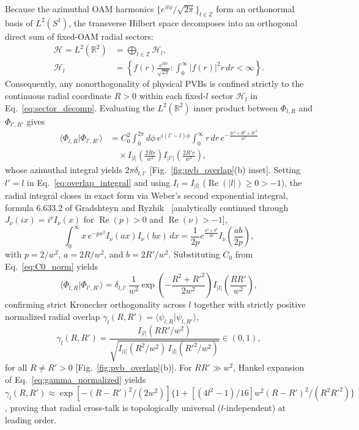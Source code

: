 \documentclass[aps,pra,onecolumn,notitlepage,11pt,tightenlines,nofootinbib,floatfix,longbibliography]{revtex4-2}
\theoremstyle{remark}
\newcommand{\braket}[2]{\langle #1 | #2 \rangle}
\newcommand{\abs}[1]{\lvert #1 \rvert}
\begin{document}
Because the azimuthal OAM harmonics $\{e^{il\phi}/\sqrt{2\pi}\}_{l\in\mathbb{Z}}$ form an orthonormal basis of $L^2(S^1)$, the transverse Hilbert space decomposes into an orthogonal direct sum of fixed-OAM radial sectors:
\begin{align}
\mathcal{H} = L^2(\mathbb{R}^2) &= \bigoplus_{l\in\mathbb{Z}} \mathcal{H}_l, \nonumber \\
\mathcal{H}_l &= \left\{ f(r)\frac{e^{il\phi}}{\sqrt{2\pi}} : \int_0^\infty \abs{f(r)}^2 r\,dr < \infty \right\}.
\label{eq:sector_decomp}
\end{align}
Consequently, any nonorthogonality of physical PVBs is confined strictly to the continuous radial coordinate $R > 0$ within each fixed-$l$ sector $\mathcal{H}_l$ in Eq.~\eqref{eq:sector_decomp}. Evaluating the $L^2(\mathbb{R}^2)$ inner product between $\Phi_{l,R}$ and $\Phi_{l',R'}$ gives
\begin{align}
\braket{\Phi_{l,R}}{\Phi_{l',R'}} &= C_0^2 \int_0^{2\pi} d\phi\, e^{i(l'-l)\phi} \int_0^\infty r\,dr\, e^{-\frac{2r^2 + R^2 + R'^2}{w^2}} \nonumber \\
&\quad \times I_{\abs{l}}\!\left(\frac{2Rr}{w^2}\right) I_{\abs{l'}}\!\left(\frac{2R'r}{w^2}\right),
\label{eq:overlap_integral}
\end{align}
whose azimuthal integral yields $2\pi\delta_{l,l'}$ [Fig.~\ref{fig:pvb_overlap}(b) inset]. Setting $l' = l$ in Eq.~\eqref{eq:overlap_integral} and using $I_l = I_{\abs{l}}$ ($\operatorname{Re}(\abs{l}) \ge 0 > -1$), the radial integral closes in exact form via Weber's second exponential integral, formula 6.633.2 of Gradshteyn and Ryzhik~\cite{Gradshteyn2014} [analytically continued through $J_\nu(ix) = i^\nu I_\nu(x)$ for $\operatorname{Re}(p) > 0$ and $\operatorname{Re}(\nu) > -1$],
\begin{equation}
\int_0^\infty x\, e^{-p x^2} I_\nu(a x) I_\nu(b x)\,dx = \frac{1}{2p} e^{\frac{a^2 + b^2}{4p}} I_\nu\!\left(\frac{ab}{2p}\right),
\label{eq:weber_identity}
\end{equation}
with $p = 2/w^2$, $a = 2R/w^2$, and $b = 2R'/w^2$. Substituting $C_0$ from Eq.~\eqref{eq:C0_norm} yields
\begin{equation}
\braket{\Phi_{l,R}}{\Phi_{l',R'}} = \delta_{l,l'}\,\frac{1}{w^2}\exp\!\left(-\frac{R^2 + R'^2}{2w^2}\right) I_{\abs{l}}\!\left(\frac{RR'}{w^2}\right),
\label{eq:overlap_closed}
\end{equation}
confirming strict Kronecker orthogonality across $l$ together with strictly positive normalized radial overlap $\gamma_l(R,R') = \braket{\psi_{l,R}}{\psi_{l,R'}}$,
\begin{equation}
\gamma_l(R,R') = \frac{I_{\abs{l}}(RR'/w^2)}{\sqrt{I_{\abs{l}}(R^2/w^2)\,I_{\abs{l}}(R'^2/w^2)}} \in (0,1),
\label{eq:gamma_normalized}
\end{equation}
for all $R \neq R' > 0$ [Fig.~\ref{fig:pvb_overlap}(b)]. For $RR' \gg w^2$, Hankel expansion of Eq.~\eqref{eq:gamma_normalized} yields $\gamma_l(R,R') \approx \exp[-(R-R')^2/(2w^2)]\{1 + [(4l^2 - 1)/16]w^2(R-R')^2/(R^2 R'^2)\}$, proving that radial cross-talk is topologically universal ($l$-independent) at leading order.
\end{document}
